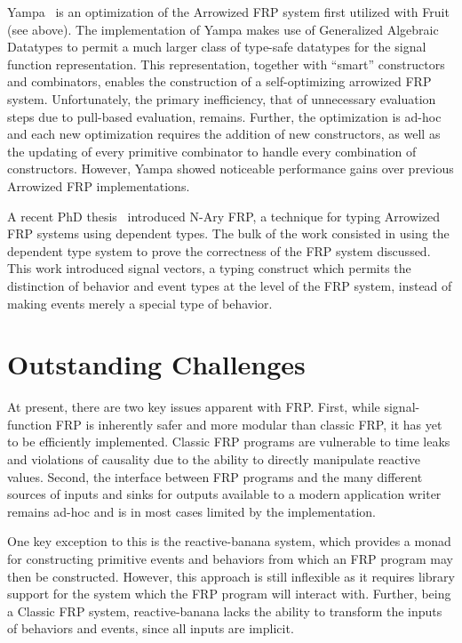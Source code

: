 Yampa~\cite{Nilsson2005} is an optimization of the Arrowized FRP system first
utilized with Fruit (see above). The implementation of Yampa makes use of
Generalized Algebraic Datatypes to permit a much larger class of type-safe
datatypes for the signal function representation. This representation,
together with ``smart'' constructors and combinators, enables the construction
of a self-optimizing arrowized FRP system. Unfortunately, the primary
inefficiency, that of unnecessary evaluation steps due to pull-based evaluation,
remains. Further, the optimization is ad-hoc and each new optimization requires
the addition of new constructors, as well as the updating of every primitive
combinator to handle every combination of constructors. However, Yampa showed
noticeable performance gains over previous Arrowized FRP implementations.

A recent PhD thesis~\cite{Sculthorpe2011} introduced N-Ary FRP, a technique for
typing Arrowized FRP systems using dependent types. The bulk of the work
consisted in using the dependent type system to prove the correctness of the FRP
system discussed. This work introduced signal vectors, a typing construct
which permits the distinction of behavior and event types at the level of the FRP
system, instead of making events merely a special type of behavior.

\section{Outstanding Challenges}
\label{section:Background-outstanding_challenges}

At present, there are two key issues apparent with FRP. First, while
signal-function FRP is inherently safer and more modular than classic FRP, it
has yet to be efficiently implemented. Classic FRP programs are vulnerable to
time leaks and violations of causality due to the ability to directly manipulate
reactive values. Second, the interface between FRP programs and the many
different sources of inputs and sinks for outputs available to a modern
application writer remains ad-hoc and is in most cases limited by the
implementation.

One key exception to this is the reactive-banana system, which provides a monad
for constructing primitive events and behaviors from which an FRP program may
then be constructed. However, this approach is still inflexible as it requires
library support for the system which the FRP program will interact with.
Further, being a Classic FRP system, reactive-banana lacks the ability to
transform the inputs of behaviors and events, since all inputs are implicit.
